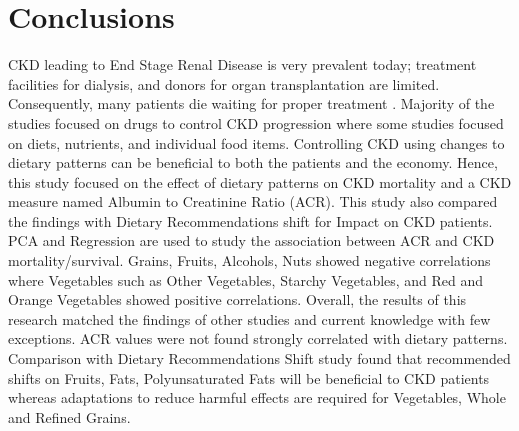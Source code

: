 \section *{Conclusions}
CKD leading to End Stage Renal Disease is very prevalent today; treatment facilities for dialysis, and donors for organ transplantation are limited. Consequently, many patients die waiting for  proper treatment \cite{Bloomberg2019}. Majority of the studies focused on drugs to control CKD progression where some studies focused on diets, nutrients, and individual food items. Controlling CKD using changes to dietary patterns can be beneficial to both the patients and the economy. Hence, this study focused on the effect of dietary patterns on CKD mortality and a CKD measure named Albumin to Creatinine Ratio (ACR). This study also compared the findings with Dietary Recommendations shift for Impact on CKD patients. PCA and Regression are used to study the association between ACR and CKD mortality/survival. Grains, Fruits, Alcohols, Nuts showed negative correlations where Vegetables such as Other Vegetables, Starchy Vegetables, and Red and Orange Vegetables showed positive correlations. Overall, the results of this research matched the findings of other studies and current knowledge with few exceptions. ACR values were not found strongly correlated with dietary patterns. Comparison with Dietary Recommendations Shift study found that recommended shifts on Fruits, Fats, Polyunsaturated Fats will be beneficial to CKD patients whereas adaptations to reduce harmful effects are required for Vegetables, Whole and Refined Grains.